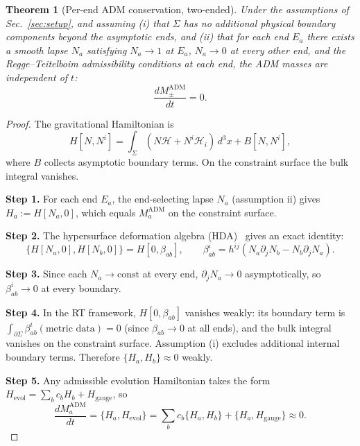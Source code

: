 \documentclass[aps,prd,onecolumn,nofootinbib,superscriptaddress]{revtex4-2}
\newtheorem{theorem}{Theorem}
\begin{document}
\begin{theorem}[Per-end ADM conservation, two-ended]
\label{thm:M-conservation}
Under the assumptions of Sec.~\ref{sec:setup}, and assuming (i) that $\Sigma$
has no additional physical boundary components beyond the asymptotic ends, and
(ii) that for each end $E_a$ there exists a smooth lapse $N_a$ satisfying
$N_a\to 1$ at $E_a$, $N_a\to 0$ at every other end, and the Regge--Teitelboim
admissibility conditions at each end,\cite{ReggeTeitelboim1974SurfaceIntegrals,Chrusciel2020ConstraintEquations} the ADM masses are independent of $t$:
\begin{equation}
  \frac{dM_\pm^{\mathrm{ADM}}}{dt} = 0.
\end{equation}
\end{theorem}

\begin{proof}
The gravitational Hamiltonian is
\begin{equation}
  H[N,N^i] = \int_\Sigma(N\mathcal{H}+N^i\mathcal{H}_i)\,d^3x + B[N,N^i],
\end{equation}
where $B$ collects asymptotic boundary terms.  On the constraint surface the
bulk integral vanishes.

\textbf{Step 1.} For each end $E_a$, the end-selecting lapse $N_a$ (assumption
ii) gives $H_a:=H[N_a,0]$, which equals $M_a^{\mathrm{ADM}}$ on the constraint
surface.

\textbf{Step 2.} The hypersurface deformation algebra
(HDA)~\cite{HojmanKucharTeitelboim1976Geometrodynamics} gives an exact identity:
\begin{equation}
  \{H[N_a,0],H[N_b,0]\} = H[0,\beta_{ab}],\qquad
  \beta_{ab}^i = h^{ij}(N_a\partial_jN_b-N_b\partial_jN_a).
\end{equation}

\textbf{Step 3.} Since each $N_a\to\mathrm{const}$ at every end, $\partial_jN_a\to 0$
asymptotically, so $\beta_{ab}^i\to 0$ at every boundary.

\textbf{Step 4.} In the RT framework, $H[0,\beta_{ab}]$ vanishes weakly:
its boundary term is $\int_{\partial\Sigma}\beta_{ab}^i(\text{metric data})=0$
(since $\beta_{ab}\to 0$ at all ends), and the bulk integral vanishes on the
constraint surface.  Assumption (i) excludes additional internal boundary
terms.  Therefore $\{H_a,H_b\}\approx 0$ weakly.

\textbf{Step 5.} Any admissible evolution Hamiltonian takes the form
$H_{\mathrm{evol}}=\sum_b c_b H_b+H_{\mathrm{gauge}}$,
so
\begin{equation}
  \frac{dM_a^{\mathrm{ADM}}}{dt}
  = \{H_a,H_{\mathrm{evol}}\}
  = \sum_b c_b\{H_a,H_b\}+\{H_a,H_{\mathrm{gauge}}\}
  \approx 0.
\end{equation}
\end{proof}
\end{document}
